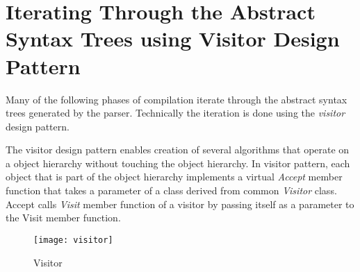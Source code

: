 \documentclass[a4paper,oneside,11pt]{book}
\theoremstyle{definition}
\begin{document}
\section{Iterating Through the Abstract Syntax Trees using Visitor Design Pattern}

Many of the following phases of compilation iterate through the abstract syntax trees generated by the parser.
Technically the iteration is done using the \emph{visitor} design pattern.

The visitor design pattern enables creation of several algorithms that operate on a object hierarchy
without touching the object hierarchy. In visitor pattern, each object that is part of the object hierarchy
implements a virtual \emph{Accept} member function that takes a parameter of a class derived from common
\emph{Visitor} class. Accept calls \emph{Visit} member function of a visitor by passing itself as a
parameter to the Visit member function.

\begin{figure}[htb]
\caption{Visitor}
\label{fig:visitor}
\begin{center}
\texttt{[image: visitor]}
\end{center}
\end{figure}
\end{document}
